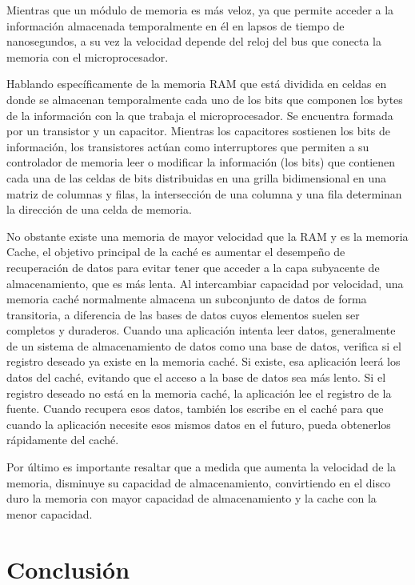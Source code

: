 \documentclass{article}
\begin{document}
\vspace{0.5cm}

Mientras que un módulo de memoria es más veloz, ya que permite acceder a la información almacenada temporalmente en él en lapsos de tiempo de nanosegundos, a su vez la velocidad depende del reloj del bus que conecta la memoria con el microprocesador.

\vspace{0.5cm}

Hablando específicamente de la memoria RAM que  está dividida en celdas en donde se almacenan temporalmente cada uno de los bits que componen los bytes de la información con la que trabaja el microprocesador. Se encuentra formada por un transistor y un capacitor. Mientras los capacitores sostienen los bits de información, los transistores actúan como interruptores que permiten a su controlador de memoria leer o modificar la información (los bits) que contienen cada una de las celdas de bits distribuidas en una grilla bidimensional en una matriz de columnas y filas, la intersección de una columna y una fila determinan la dirección de una celda de memoria.

\vspace{0.5cm}

No obstante existe una memoria  de mayor velocidad que la RAM y es la memoria Cache, el objetivo principal de la caché es aumentar el desempeño de recuperación de datos para evitar tener que acceder a la capa subyacente de almacenamiento, que es más lenta. Al intercambiar capacidad por velocidad, una memoria caché normalmente almacena un subconjunto de datos de forma transitoria, a diferencia de las bases de datos cuyos elementos suelen ser completos y duraderos. Cuando una aplicación intenta leer datos, generalmente de un sistema de almacenamiento de datos como una base de datos, verifica si el registro deseado ya existe en la memoria caché. Si existe, esa aplicación leerá los datos del caché, evitando que el acceso a la base de datos sea más lento. Si el registro deseado no está en la memoria caché, la aplicación lee el registro de la fuente. Cuando recupera esos datos, también los escribe en el caché para que cuando la aplicación necesite esos mismos datos en el futuro, pueda obtenerlos rápidamente del caché.

\vspace{0.5cm}

Por último es importante resaltar que a medida que aumenta la velocidad de la memoria, disminuye su capacidad de almacenamiento, convirtiendo en el disco duro la memoria  con mayor capacidad de almacenamiento y la cache con la menor capacidad.

\section{Conclusión}



\end{document}
